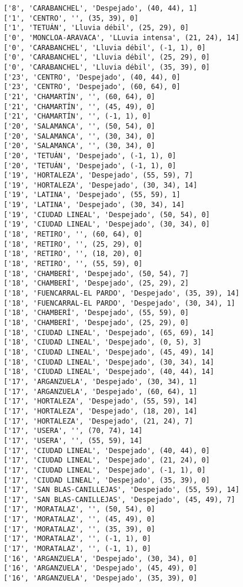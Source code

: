 \documentclass[11pt]{article}
\begin{document}
\begin{Verbatim}[commandchars=\\\{\}]
['8', 'CARABANCHEL', 'Despejado', (40, 44), 1]
['1', 'CENTRO', '', (35, 39), 0]
['1', 'TETUÁN', 'Lluvia débil', (25, 29), 0]
['0', 'MONCLOA-ARAVACA', 'LLuvia intensa', (21, 24), 14]
['0', 'CARABANCHEL', 'Lluvia débil', (-1, 1), 0]
['0', 'CARABANCHEL', 'Lluvia débil', (25, 29), 0]
['0', 'CARABANCHEL', 'Lluvia débil', (35, 39), 0]
['23', 'CENTRO', 'Despejado', (40, 44), 0]
['23', 'CENTRO', 'Despejado', (60, 64), 0]
['21', 'CHAMARTÍN', '', (60, 64), 0]
['21', 'CHAMARTÍN', '', (45, 49), 0]
['21', 'CHAMARTÍN', '', (-1, 1), 0]
['20', 'SALAMANCA', '', (50, 54), 0]
['20', 'SALAMANCA', '', (30, 34), 0]
['20', 'SALAMANCA', '', (30, 34), 0]
['20', 'TETUÁN', 'Despejado', (-1, 1), 0]
['20', 'TETUÁN', 'Despejado', (-1, 1), 0]
['19', 'HORTALEZA', 'Despejado', (55, 59), 7]
['19', 'HORTALEZA', 'Despejado', (30, 34), 14]
['19', 'LATINA', 'Despejado', (55, 59), 1]
['19', 'LATINA', 'Despejado', (30, 34), 14]
['19', 'CIUDAD LINEAL', 'Despejado', (50, 54), 0]
['19', 'CIUDAD LINEAL', 'Despejado', (30, 34), 0]
['18', 'RETIRO', '', (60, 64), 0]
['18', 'RETIRO', '', (25, 29), 0]
['18', 'RETIRO', '', (18, 20), 0]
['18', 'RETIRO', '', (55, 59), 0]
['18', 'CHAMBERÍ', 'Despejado', (50, 54), 7]
['18', 'CHAMBERÍ', 'Despejado', (25, 29), 2]
['18', 'FUENCARRAL-EL PARDO', 'Despejado', (35, 39), 14]
['18', 'FUENCARRAL-EL PARDO', 'Despejado', (30, 34), 1]
['18', 'CHAMBERÍ', 'Despejado', (55, 59), 0]
['18', 'CHAMBERÍ', 'Despejado', (25, 29), 0]
['18', 'CIUDAD LINEAL', 'Despejado', (65, 69), 14]
['18', 'CIUDAD LINEAL', 'Despejado', (0, 5), 3]
['18', 'CIUDAD LINEAL', 'Despejado', (45, 49), 14]
['18', 'CIUDAD LINEAL', 'Despejado', (30, 34), 14]
['18', 'CIUDAD LINEAL', 'Despejado', (40, 44), 14]
['17', 'ARGANZUELA', 'Despejado', (30, 34), 1]
['17', 'ARGANZUELA', 'Despejado', (60, 64), 1]
['17', 'HORTALEZA', 'Despejado', (55, 59), 14]
['17', 'HORTALEZA', 'Despejado', (18, 20), 14]
['17', 'HORTALEZA', 'Despejado', (21, 24), 7]
['17', 'USERA', '', (70, 74), 14]
['17', 'USERA', '', (55, 59), 14]
['17', 'CIUDAD LINEAL', 'Despejado', (40, 44), 0]
['17', 'CIUDAD LINEAL', 'Despejado', (21, 24), 0]
['17', 'CIUDAD LINEAL', 'Despejado', (-1, 1), 0]
['17', 'CIUDAD LINEAL', 'Despejado', (35, 39), 0]
['17', 'SAN BLAS-CANILLEJAS', 'Despejado', (55, 59), 14]
['17', 'SAN BLAS-CANILLEJAS', 'Despejado', (45, 49), 7]
['17', 'MORATALAZ', '', (50, 54), 0]
['17', 'MORATALAZ', '', (45, 49), 0]
['17', 'MORATALAZ', '', (35, 39), 0]
['17', 'MORATALAZ', '', (-1, 1), 0]
['17', 'MORATALAZ', '', (-1, 1), 0]
['16', 'ARGANZUELA', 'Despejado', (30, 34), 0]
['16', 'ARGANZUELA', 'Despejado', (45, 49), 0]
['16', 'ARGANZUELA', 'Despejado', (35, 39), 0]

\end{Verbatim}
\end{document}
